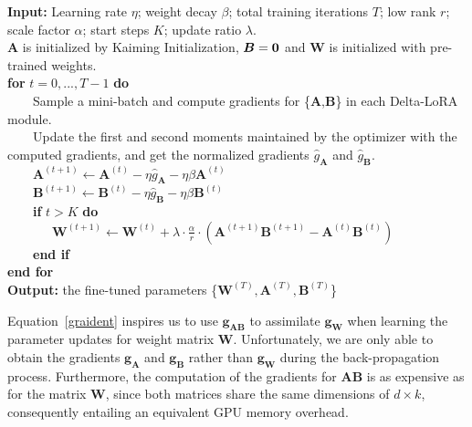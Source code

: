 {\begin{algorithm*}
 \caption{Delta-LoRA}
 \label{algorithm_c-lora}
 \begin{algorithmic}
     \item \textbf{Input:} Learning rate $\eta$; weight decay $\beta$; total training iterations $T$; low rank $r$; scale factor $\alpha$; start steps $K$; update ratio $\lambda$.\\
     $\boldsymbol{A}$ is initialized by Kaiming Initialization, $\boldsymbol{B}=\bf{0}$ and $\boldsymbol{W}$ is initialized with pre-trained weights. \\
     \textbf{for} $t=0,...,T-1$ \textbf{do} \\
     \ \ \ \ Sample a mini-batch and compute gradients for \{$\boldsymbol{A}$,$\boldsymbol{B}$\} in each Delta-LoRA module.\\
     \ \ \ \ Update the first and second moments maintained by the optimizer with the computed gradients, and get the normalized gradients $\widehat{g}_{\boldsymbol{A}}$ and $\widehat{g}_{\boldsymbol{B}}$.\\
     \ \ \ \ $\boldsymbol{A}^{(t+1)} \leftarrow \boldsymbol{A}^{(t)}-\eta \widehat{g}_{\boldsymbol{A}} - \eta \beta \boldsymbol{A}^{(t)}$ \\
     \ \ \ \ $\boldsymbol{B}^{(t+1)} \leftarrow \boldsymbol{B}^{(t)}-\eta \widehat{g}_{\boldsymbol{B}} - \eta \beta \boldsymbol{B}^{(t)}$ \\
     \ \ \ \ \textbf{if} $t>K$ \textbf{do} \\
     \ \ \ \ \ \ \ $\boldsymbol{W}^{(t+1)} \leftarrow \boldsymbol{W}^{(t)} + \lambda \cdot \frac{\alpha}{r} \cdot (\boldsymbol{A}^{(t+1)}\boldsymbol{B}^{(t+1)} - \boldsymbol{A}^{(t)}\boldsymbol{B}^{(t)})$ \\
     \ \ \ \ \textbf{end if} \\
     \textbf{end for} \\
     \textbf{Output:} the fine-tuned parameters \{$\boldsymbol{W}^{(T)}, \boldsymbol{A}^{(T)}, \boldsymbol{B}^{(T)}$\}
 \end{algorithmic}

\end{algorithm*}

\normalsize
Equation~\ref{graident} inspires us to use $\boldsymbol{g}_{\boldsymbol{A}\boldsymbol{B}}$ to assimilate $\boldsymbol{g}_{\boldsymbol{W}}$ when learning the parameter updates for weight matrix $\boldsymbol{W}$.
Unfortunately, we are only able to obtain the gradients $\boldsymbol{g}_{\boldsymbol{A}}$ and $\boldsymbol{g}_{\boldsymbol{B}}$ rather than $\boldsymbol{g}_{\boldsymbol{W}}$ during the back-propagation process. Furthermore, the computation of the gradients for $\boldsymbol{A}\boldsymbol{B}$ is as expensive as for the matrix $\boldsymbol{W}$, since both matrices share the same dimensions of $d\times k$, consequently entailing an equivalent GPU memory overhead. 

}
